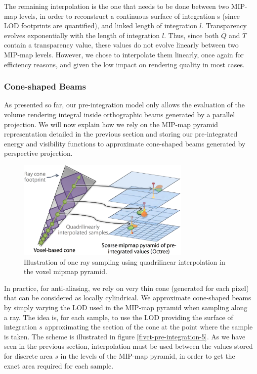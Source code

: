 The remaining interpolation is the one that needs to be done between two MIP-map levels, in order to reconstruct a continuous surface of integration s (since LOD footprints are quantified), and linked length of integration $l$. Transparency evolves exponentially with the length of integration $l$. Thus, since both $\overline{Q}$ and $\overline{T}$ contain a transparency value, these values do not evolve linearly between two MIP-map levels. However, we chose to interpolate them linearly, once again for efficiency reasons, and given the low impact on rendering quality in most cases.





\subsubsection{Cone-shaped Beams}
As presented so far, our pre-integration model only allows the evaluation of the volume rendering integral inside orthographic beams generated by a parallel projection. We will now explain how we rely on the MIP-map pyramid representation detailed in the previous section and storing our pre-integrated energy and visibility functions to approximate cone-shaped beams generated by perspective projection.

\begin{figure}
	\begin{center}
		\includegraphics[width=0.75\textwidth]{graphics/vct/vct-7-4}
	\end{center}
	\caption{Illustration of one ray sampling using quadrilinear interpolation in the voxel mipmap pyramid.}
\end{figure}

In practice, for anti-aliasing, we rely on very thin cone (generated for each pixel) that can be considered as locally cylindrical. We approximate cone-shaped beams by simply varying the LOD used in the MIP-map pyramid when sampling along a ray. The idea is, for each sample, to use the LOD providing the surface of integration $s$ approximating the section of the cone at the point where the sample is taken. The scheme is illustrated in figure \ref{f:vct-pre-integration-5}. As we have seen in the previous section, interpolation must be used between the values stored for discrete area $s$ in the levels of the MIP-map pyramid, in order to get the exact area required for each sample.

